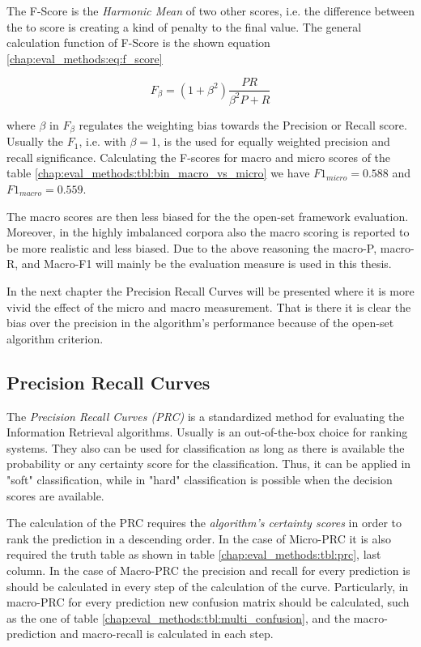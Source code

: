 The F-Score is the \textit{Harmonic Mean} of two other scores, i.e. the difference between the to score is creating a kind of penalty to the final value. The general calculation function of F-Score is the shown equation \ref{chap:eval_methods:eq:f_score}

\begin{equation}\label{chap:eval_methods:eq:recall}
	F_{\beta} = (1 + \beta^{2}) \frac {P R} {\beta^{2} P + R}
\end{equation}

\noindent
where $\beta$ in $F_{\beta}$ regulates the weighting bias towards the Precision or Recall score. Usually the $F_{1}$, i.e. with $\beta = 1$, is the used for equally weighted precision and recall significance. Calculating the F-scores for macro and micro scores of the table \ref{chap:eval_methods:tbl:bin_macro_vs_micro} we have $F1_{micro} = 0.588$ and $F1_{macro} = 0.559$.

The macro scores are then less biased for the the open-set framework evaluation. Moreover, in the highly imbalanced corpora also the macro scoring is reported to be more realistic and less biased. Due to the above reasoning the macro-P, macro-R, and Macro-F1 will mainly be the evaluation measure is used in this thesis.

In the next chapter the Precision Recall Curves will be presented where it is more vivid the effect of the micro and macro measurement. That is there it is clear the bias over the precision in the algorithm's performance because of the open-set algorithm criterion.


\subsection{Precision Recall Curves}\label{chap:eval_methods:sec:roc_prc}

The \textit{Precision Recall Curves (PRC)} is a standardized method for evaluating the Information Retrieval algorithms. Usually is an out-of-the-box choice for ranking systems. They also can be used for classification as long as there is available the probability or any certainty score for the classification. Thus, it can be applied in "soft" classification, while in "hard" classification is possible when the decision scores are available. 

The calculation of the PRC requires the \textit{algorithm's certainty scores} in order to rank the prediction in a descending order. In the case of Micro-PRC it is also required the truth table as shown in table \ref{chap:eval_methods:tbl:prc}, last column. In the case of Macro-PRC the precision and recall for every prediction is should be calculated in every step of the calculation of the curve. Particularly, in macro-PRC for every prediction new confusion matrix should be calculated, such as the one of table \ref{chap:eval_methods:tbl:multi_confusion}, and the macro-prediction and macro-recall is calculated in each step.


